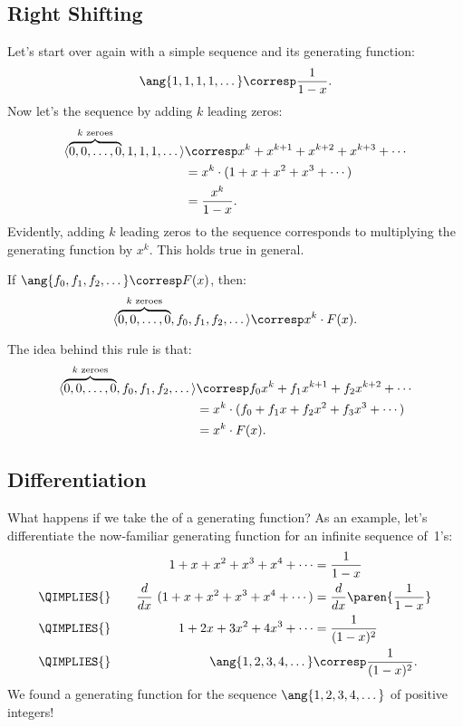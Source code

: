 \subsection{Right Shifting}

Let's start over again with a simple sequence and its generating
function:
%
\[
    \ang{1, 1, 1, 1, \dots} \corresp \frac{1}{1-x}.
\]
%
Now let's  the sequence by adding $k$ leading
zeros:
%
\begin{align*}
\langle\overbrace{0, 0, \dots, 0}^{\text{$k$ zeroes}}, 1, 1, 1, \dots\rangle
        & \corresp x^k + x^{k+1} + x^{k+2} + x^{k+3} + \cdots \\
        & = x^k \cdot (1  + x + x^2 + x^3 + \cdots) \\
        & = \frac{x^k}{1-x}.
\end{align*}
%
Evidently, adding $k$ leading zeros to the sequence corresponds to
multiplying the generating function by $x^k$.  This holds true in
general.

\begin{rul}
\label{rule:shift}
If $\ang{f_0, f_1, f_2, \dots} \corresp F(x)$, then:
%
\[
\langle \overbrace{0, 0, \dots, 0}^{\text{$k$ zeroes}}, f_0, f_1, f_2, \dots\rangle \corresp x^k \cdot F(x).
\]
\end{rul}

The idea behind this rule is that:
\begin{align*}
\langle\overbrace{0, 0, \dots, 0}^{\text{$k$ zeroes}}, f_0, f_1, f_2, \dots\rangle
    & \corresp f_0 x^k + f_1 x^{k+1} + f_2 x^{k+2} + \cdots \\
    & = x^k \cdot (f_0 + f_1 x + f_2 x^2 + f_3 x^3 + \cdots) \\
    & = x^k \cdot F(x).
\end{align*}

\subsection{Differentiation}

What happens if we take the  of a generating
function?  As an example, let's differentiate the now-familiar
generating function for an infinite sequence of~1's:
%
\begin{alignat}{2}
&\quad&
    1 + x + x^2 + x^3 + x^4 + \cdots
        & {}= \frac{1}{1-x} \notag\\
{}\QIMPLIES{}
    &&\frac{d}{dx} \ (1 + x + x^2 + x^3 + x^4 + \cdots)
        & = \frac{d}{dx} \paren{\frac{1}{1-x}} \notag\\
{}\QIMPLIES{}&&
    1 + 2x + 3x^2 + 4x^3 + \cdots & = \frac{1}{(1-x)^2} \notag\\
{}\QIMPLIES{}&&
    \ang{1, 2, 3, 4, \dots}  & \corresp \frac{1}{(1-x)^2}.\label{sumixi-1}
\end{alignat}
%
We found a generating function for the sequence $\ang{1, 2, 3, 4,
\dots}$ of positive integers!


